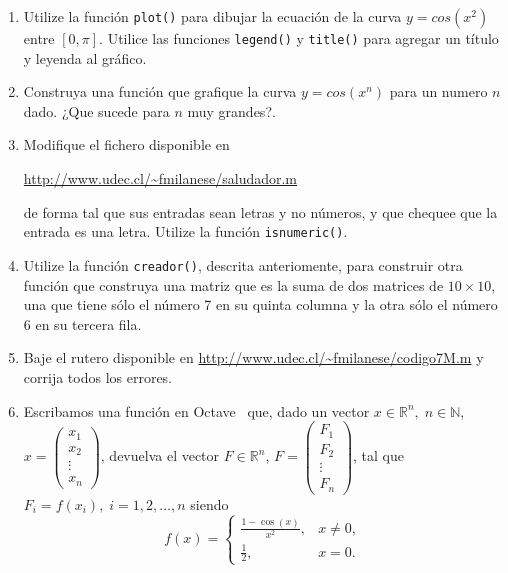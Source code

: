 \documentclass[letter,11pt]{article}
\newcommand{\N}{\mathbb{N}}
\newcommand\R{\mathbb{R}}
\newcommand\0{\mathbf{0}}
\newcommand{\octave}{{\sc Octave }}
\begin{document}
\begin{enumerate}
   \item Utilize la funci\'on \texttt{plot()} para dibujar la ecuaci\'on de la curva $y=cos(x^2)$ entre $[0,\pi]$.  Utilice las funciones \texttt{legend()} y \texttt{title()} para agregar un t\'itulo y leyenda al gr\'afico.
   
   \item Construya una funci\'on que grafique la curva $y=cos(x^n)$ para un numero $n$ dado. ¿Que sucede para $n$ muy grandes?.
   
   \item Modifique el fichero disponible en 
   
   \url{http://www.udec.cl/~fmilanese/saludador.m}
   
  de forma tal que sus entradas sean letras y no n\'umeros, y que chequee que la entrada es una letra. Utilize la funci\'on \texttt{isnumeric()}.
    \item Utilize la funci\'on \texttt{creador()}, descrita anteriomente, para construir otra funci\'on que construya una matriz que es la suma de dos matrices de $10\times 10$, una que tiene s\'olo el n\'umero 7 en su quinta columna y la otra s\'olo el n\'umero 6 en su tercera fila.
    \item Baje el rutero disponible en \url{http://www.udec.cl/~fmilanese/codigo7M.m} y corrija todos los errores.

      
\item Escribamos una funci\'on en \octave\, que, dado un vector $x \in \R^n,\; n \in \N$,
$x = \begin{pmatrix}x_1\\x_2\\\vdots\\x_n\end{pmatrix}$,		
devuelva el vector $F \in \R^n$,
$F = \begin{pmatrix}F_1\\F_2\\\vdots\\F_n\end{pmatrix}$,
tal que $F_i = f(x_i),\;i=1,2,\ldots,n$ siendo
\begin{equation}\label{ejemplo1}
f(x) = \begin{cases}
\frac{1-\cos(x)}{x^2}, & x \ne 0,\\
\frac 1 2, & x = 0.
\end{cases}                                	
\end{equation}



\end{enumerate}
\end{document}
